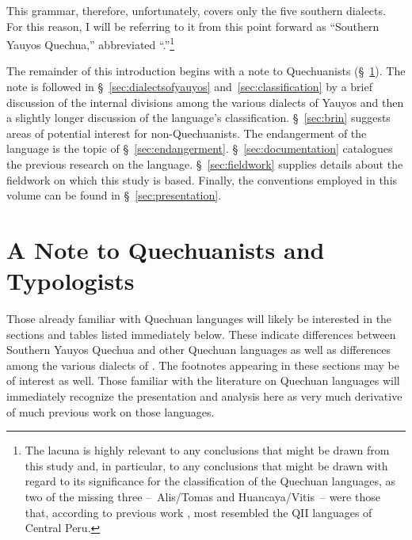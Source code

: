 This grammar, therefore, unfortunately, covers only the five southern dialects. For this reason, I will be referring to it from this point forward as “Southern Yauyos Quechua,” abbreviated “\SYQ.”\footnote{The lacuna is highly relevant to any conclusions that might be drawn from this study and, in particular, to any conclusions that might be drawn with regard to its significance for the classification of the Quechuan languages, as two of the missing three --~Alis/Tomas and Huancaya/Vitis~-- were those that, according to previous work \citep{Taylor94a,Taylor00}, most resembled the QII languages of Central Peru.}

The remainder of this introduction begins with a note to Quechuanists (§~\ref{sec:notetoquechuanists}). The note is followed in §~\ref{sec:dialectsofyauyos} and~\ref{sec:classification} by a brief discussion of the internal divisions among the various dialects of Yauyos and then a slightly longer discussion of the language’s classification. §~\ref{sec:brin} suggests areas of potential interest for non-Quechuanists. The endangerment of the language is the topic of §~\ref{sec:endangerment}. §~\ref{sec:documentation} catalogues the previous research on the language. §~\ref{sec:fieldwork} supplies details about the fieldwork on which this study is based. Finally, the conventions employed in this volume can be found in §~\ref{sec:presentation}.

\section{A Note to Quechuanists and Typologists}\label{sec:notetoquechuanists} 
Those already familiar with Quechuan languages will likely be interested in the sections and tables listed immediately below. These indicate differences between Southern Yauyos Quechua and other Quechuan languages as well as differences among the various dialects of \SYQ. The footnotes appearing in these sections may be of interest as well. Those familiar with the literature on Quechuan languages will immediately recognize the presentation and analysis here as very much derivative of much previous work on those languages.\\

